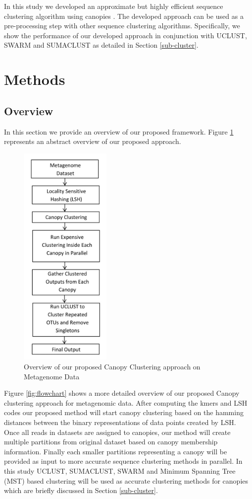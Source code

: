 \documentclass[10pt, conference, compsocconf]{IEEEtran}
\begin{document}
In 
this study we developed an approximate but highly efficient 
sequence clustering algorithm  using canopies \cite{MARCanopy}. 
%
The developed approach can be used as a pre-processing step with other 
sequence clustering algorithms. Specifically, we show the 
performance of our developed approach in conjunction with UCLUST, 
SWARM and SUMACLUST as detailed in Section \ref{sub-cluster}.

\section{Methods}
\label{featMethod}
\subsection{\textbf{Overview}}
In this section we provide an overview of our proposed framework. Figure \ref{fig:overall} represents an abstract overview of our proposed approach.

\begin{figure}
	\centering
	\includegraphics[width=0.5\linewidth,height=11cm]{overall.jpg}	
	\caption{Overview of our proposed Canopy Clustering approach on Metagenome Data}
	\label{fig:overall}
\end{figure} 

Figure \ref{fig:flowchart} shows a more detailed overview of our proposed Canopy clustering approach for metagenomic data. After computing the kmers and LSH codes our proposed method will start canopy clustering based on the hamming distances between the binary representations of data points created by LSH. Once all reads in datasets are assigned to canopies, our method will create multiple partitions from original dataset based on canopy membership information. Finally each smaller partitions representing a canopy will be provided as input to more accurate sequence clustering methods in parallel. In this study UCLUST, SUMACLUST, SWARM and Minimum Spanning Tree (MST) based clustering will be used as accurate clustering methods for canopies which are briefly discussed in Section \ref{sub-cluster}.
\end{document}
